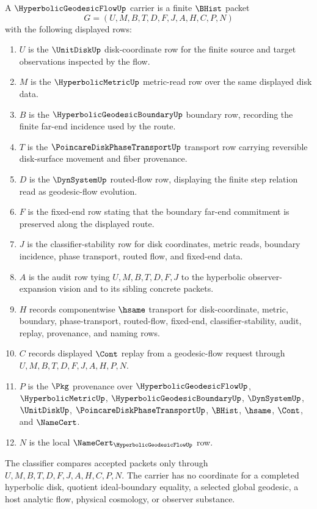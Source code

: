 \begin{definition}
\label{def:hyperbolic-geodesic-flow-carrier}
A $\HyperbolicGeodesicFlowUp$ carrier is a finite $\BHist$ packet
$$
G=(U,M,B,T,D,F,J,A,H,C,P,N)
$$
with the following displayed rows:
\begin{enumerate}
\item $U$ is the $\UnitDiskUp$ disk-coordinate row for the finite source and target observations inspected by the flow.
\item $M$ is the $\HyperbolicMetricUp$ metric-read row over the same displayed disk data.
\item $B$ is the $\HyperbolicGeodesicBoundaryUp$ boundary row, recording the finite far-end incidence used by the route.
\item $T$ is the $\PoincareDiskPhaseTransportUp$ transport row carrying reversible disk-surface movement and fiber provenance.
\item $D$ is the $\DynSystemUp$ routed-flow row, displaying the finite step relation read as geodesic-flow evolution.
\item $F$ is the fixed-end row stating that the boundary far-end commitment is preserved along the displayed route.
\item $J$ is the classifier-stability row for disk coordinates, metric reads, boundary incidence, phase transport, routed flow, and fixed-end data.
\item $A$ is the audit row tying $U,M,B,T,D,F,J$ to the hyperbolic observer-expansion vision and to its sibling concrete packets.
\item $H$ records componentwise $\hsame$ transport for disk-coordinate, metric, boundary, phase-transport, routed-flow, fixed-end, classifier-stability, audit, replay, provenance, and naming rows.
\item $C$ records displayed $\Cont$ replay from a geodesic-flow request through $U,M,B,T,D,F,J,A,H,P,N$.
\item $P$ is the $\Pkg$ provenance over $\HyperbolicGeodesicFlowUp$, $\HyperbolicMetricUp$, $\HyperbolicGeodesicBoundaryUp$, $\DynSystemUp$, $\UnitDiskUp$, $\PoincareDiskPhaseTransportUp$, $\BHist$, $\hsame$, $\Cont$, and $\NameCert$.
\item $N$ is the local $\NameCert_{\HyperbolicGeodesicFlowUp}$ row.
\end{enumerate}
The classifier compares accepted packets only through $U,M,B,T,D,F,J,A,H,C,P,N$. The carrier has no coordinate for a completed hyperbolic disk, quotient ideal-boundary equality, a selected global geodesic, a host analytic flow, physical cosmology, or observer substance.
\end{definition}

